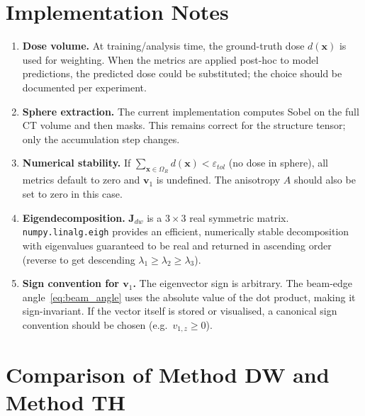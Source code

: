 \documentclass[11pt,a4paper]{article}
\newcommand{\vx}{\mathbf{x}}
\newcommand{\vv}{\mathbf{v}}
\newcommand{\vJ}{\mathbf{J}}
\begin{document}
\section{Implementation Notes}

\begin{enumerate}
    \item \textbf{Dose volume.}
          At training/analysis time, the ground-truth dose $d(\vx)$ is used
          for weighting.
          When the metrics are applied post-hoc to model predictions, the
          predicted dose could be substituted; the choice should be documented
          per experiment.

    \item \textbf{Sphere extraction.}
          The current implementation computes Sobel on the full CT volume and
          then masks.
          This remains correct for the structure tensor; only the accumulation
          step changes.

    \item \textbf{Numerical stability.}
          If $\sum_{\vx \in \Omega_R} d(\vx) < \varepsilon_{tol}$ (no dose
          in sphere), all metrics default to zero and $\vv_1$ is undefined.
          The anisotropy $A$ should also be set to zero in this case.

    \item \textbf{Eigendecomposition.}
          $\vJ_{dw}$ is a $3\times3$ real symmetric matrix.
          \texttt{numpy.linalg.eigh} provides an efficient, numerically stable
          decomposition with eigenvalues guaranteed to be real and returned in
          ascending order (reverse to get descending $\lambda_1 \geq \lambda_2
          \geq \lambda_3$).

    \item \textbf{Sign convention for $\vv_1$.}
          The eigenvector sign is arbitrary.
          The beam-edge angle~\eqref{eq:beam_angle} uses the absolute value of
          the dot product, making it sign-invariant.
          If the vector itself is stored or visualised, a canonical sign
          convention should be chosen (e.g.\ $v_{1,z} \geq 0$).
\end{enumerate}

\section{Comparison of Method DW and Method TH}
\label{sec:comparison}
\end{document}
